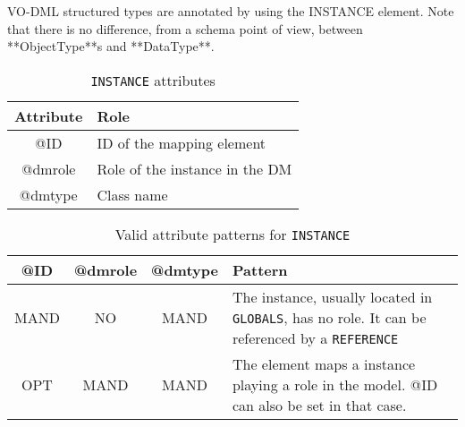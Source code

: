 VO-DML structured types are annotated by using the INSTANCE
element. Note that there is no difference, from a schema point of view,
between **ObjectType**s and **DataType**.

\begin{table}[!htbp]
\small
\centering
\begin{tabulary}{\linewidth}{|c|J|}       
       \hline 
            \textbf{Attribute} & 
            \textbf {Role}\\
       \hline         \hline  
            @ID & 
            ID of the mapping element  \\
        \hline 
            @dmrole & 
            Role of the instance in the DM \\
        \hline 
            @dmtype & 
            Class name \\
        \hline 
     \end{tabulary}
     \caption{\texttt{INSTANCE} attributes} 
     \label{tbl:instance-att}
 \end{table}

\begin{table}[!htbp]
\small
\centering
\begin{tabulary}{\linewidth}{|c|c|c|J|}
    \hline 
        \textbf{@ID} &
        \textbf{@dmrole} &
        \textbf{@dmtype} &
        \textbf{Pattern}\\
    \hline      \hline  
        MAND &           
        NO &           
        MAND &           
        The instance, usually located in \texttt{GLOBALS}, has no role. It can be referenced by a \texttt{REFERENCE}  \\
    \hline   
        OPT &           
        MAND &           
        MAND &           
        The element maps a instance playing a role in the model. @ID can also be set in that case. \\
   \hline 
\end{tabulary}
     \caption{Valid attribute patterns for  \texttt{INSTANCE}} 
     \label{tbl:instance-pattern}
 \end{table}


